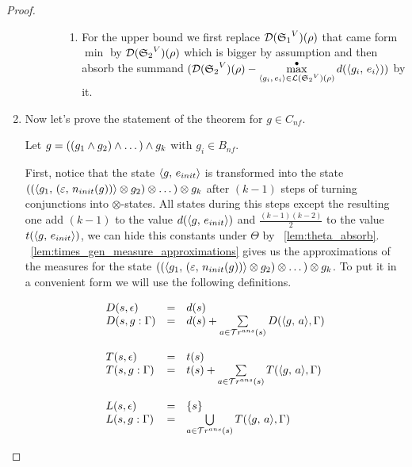 \begin{proof}
\begin{enumerate}
\begin{enumerate}
\begin{enumerate}
\begin{enumerate}
			\item For the upper bound we first replace $\mathcal{D}({\mathfrak{S}_1}^{V})(\rho)$ that came form $\min$ by $\mathcal{D}({\mathfrak{S}_2}^{V})(\rho)$ which is bigger by assumption and then absorb the summand $(\mathcal{D}({\mathfrak{S}_2}^{V})(\rho) - \max^{\bullet}\limits_{\langle g_i ,\, e_i \rangle \in \mathcal{L}({\mathfrak{S}_2}^{V})(\rho)} d(\langle g_i ,\, e_i \rangle))$ by it.
			
			\end{enumerate}		
   		\end{enumerate}
	\end{enumerate}

\item Now let's prove the statement of the theorem for $g \in C_{nf}$.

Let $g = { ((g_1 \land g_2) \land \dots) \land g_k }$ with $g_i \in B_{nf}$.

First, notice that the state $\langle g ,\, e_{init} \rangle$ is transformed into the state \\ ${ ((\langle g_1 ,\, (\varepsilon ,\, n_{init}(g)) \rangle \otimes g_2) \otimes \dots) \otimes g_k }$ after $(k - 1)$ steps of turning conjunctions into $\otimes$-states. All states during this steps except the resulting one add $(k - 1)$ to the value $d(\langle g ,\, e_{init} \rangle)$ and $\frac{(k - 1)(k - 2)}{2}$ to the value $t(\langle g ,\, e_{init} \rangle)$, we can hide this constants under $\Theta$ by \lemmaword~\ref{lem:theta_absorb}. \lemmaword~\ref{lem:times_gen_measure_approximations} gives us the approximations of the measures for the state ${ ((\langle g_1 ,\, (\varepsilon ,\, n_{init}(g)) \rangle \otimes g_2) \otimes \dots) \otimes g_k }$. To put it in a convenient form we will use the following definitions.

\[ \begin{array}{lcl}
D(s, \epsilon) & = & d(s) \\
D(s, g : \Gamma) & = & d(s) + \sum\limits_{a \in \mathcal{T}r^{ans}(s)} D(\langle g ,\, a \rangle, \Gamma) \\
\\
T(s, \epsilon) & = & t(s) \\
T(s, g : \Gamma) & = & t(s) + \sum\limits_{a \in \mathcal{T}r^{ans}(s)} T(\langle g ,\, a \rangle, \Gamma) \\
\\
L(s, \epsilon) & = & \{ s \} \\
L(s, g : \Gamma) & = & \bigcup\limits_{a \in \mathcal{T}r^{ans}(s)} T(\langle g ,\, a \rangle, \Gamma) \\
\end{array}
\]


\end{enumerate}
\end{proof}
